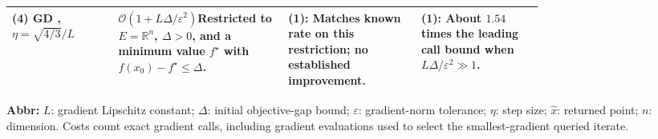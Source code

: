 \begin{table}[tp]
\begin{threeparttable}
\begin{tabularx}{\linewidth}{@{}>{\raggedright\arraybackslash}p{0.20\linewidth}>{\raggedright\arraybackslash}p{0.32\linewidth}>{\raggedright\arraybackslash}p{0.25\linewidth}>{\raggedright\arraybackslash}X@{}}
\midrule
\textbf{(4)} GD \citep[Thm.~2, Eq.~(15)]{snADKZ2022}, $\eta=\sqrt{4/3}/L$ & $\mathcal{O}(1+L\Delta/\varepsilon^2)$\newline Restricted to $E=\mathbb R^n$, $\Delta>0$, and a minimum value $f^\star$ with $f(x_0)-f^\star\le\Delta$. & \textbf{(1)}: Matches known rate on this restriction; no established improvement. & \textbf{(1)}: About $1.54$ times the leading call bound when $L\Delta/\varepsilon^2\gg1$. \\
\bottomrule
\end{tabularx}
\begin{tablenotes}[flushleft]\footnotesize
\item[] \textbf{Abbr:} $L$: gradient Lipschitz constant; $\Delta$: initial objective-gap bound; $\varepsilon$: gradient-norm tolerance; $\eta$: step size; $\widehat x$: returned point; $n$: dimension. Costs count exact gradient calls, including gradient evaluations used to select the smallest-gradient queried iterate.
\end{tablenotes}
\end{threeparttable}
\end{table}
\clearpage

